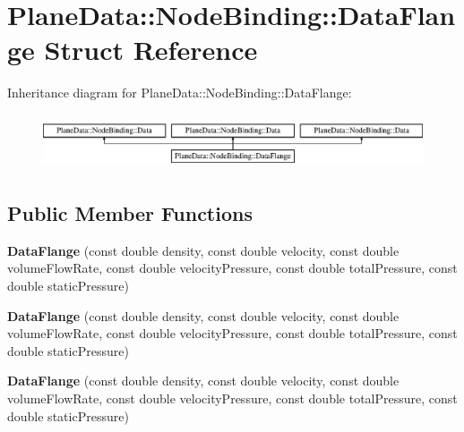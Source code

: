 \hypertarget{struct_plane_data_1_1_node_binding_1_1_data_flange}{}\section{Plane\+Data\+:\+:Node\+Binding\+:\+:Data\+Flange Struct Reference}
\label{struct_plane_data_1_1_node_binding_1_1_data_flange}
Inheritance diagram for Plane\+Data\+:\+:Node\+Binding\+:\+:Data\+Flange\+:\begin{figure}[H]
\begin{center}
\leavevmode
\includegraphics[height=1.644640cm]{d5/d92/struct_plane_data_1_1_node_binding_1_1_data_flange}
\end{center}
\end{figure}
\subsection*{Public Member Functions}
\begin{DoxyCompactItemize}
\item 
\mbox{\label{struct_plane_data_1_1_node_binding_1_1_data_flange_ab70d450f11914a68f121f32b58b11f29}} 
{\bfseries Data\+Flange} (const double density, const double velocity, const double volume\+Flow\+Rate, const double velocity\+Pressure, const double total\+Pressure, const double static\+Pressure)
\item 
\mbox{\label{struct_plane_data_1_1_node_binding_1_1_data_flange_ab70d450f11914a68f121f32b58b11f29}} 
{\bfseries Data\+Flange} (const double density, const double velocity, const double volume\+Flow\+Rate, const double velocity\+Pressure, const double total\+Pressure, const double static\+Pressure)
\item 
\mbox{\label{struct_plane_data_1_1_node_binding_1_1_data_flange_ab70d450f11914a68f121f32b58b11f29}} 
{\bfseries Data\+Flange} (const double density, const double velocity, const double volume\+Flow\+Rate, const double velocity\+Pressure, const double total\+Pressure, const double static\+Pressure)
\end{DoxyCompactItemize}
